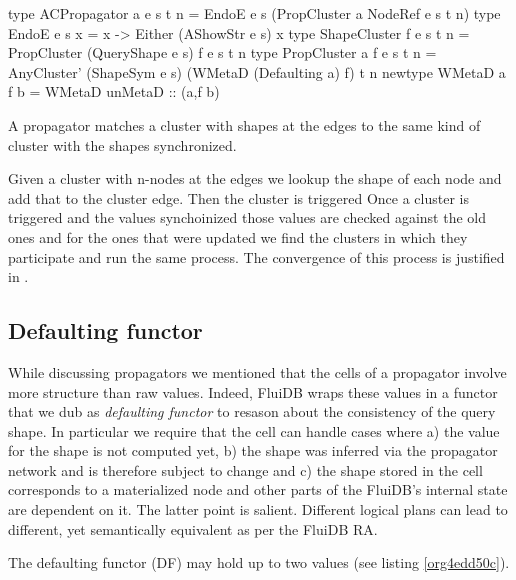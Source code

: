 \begin{listing}[p]
  \begin{haskell}
    type ACPropagator a e s t n =
      EndoE e s (PropCluster a NodeRef e s t n)
    type EndoE e s x = x -> Either (AShowStr e s) x
    type ShapeCluster f e s t n = PropCluster (QueryShape e s) f e s t n
    type PropCluster a f e s t n =
      AnyCluster' (ShapeSym e s) (WMetaD (Defaulting a) f) t n
    newtype WMetaD a f b = WMetaD { unMetaD :: (a,f b)}
      \end{haskell}
  \caption{\label{org945807f}A propagator matches a cluster with shapes at the edges to the same kind of cluster with the shapes synchronized.}
\end{listing}

Given a cluster with n-nodes at the edges we lookup the shape of each
node and add that to the cluster edge. Then the cluster is triggered
Once a cluster is triggered and the values synchoinized those values
are checked against the old ones and for the ones that were updated we
find the clusters in which they participate and run the same
process. The convergence of this process is justified in
\cite{kuperLVarsLatticebasedData2013}.


\subsection{Defaulting functor}
\label{sec:org1d77ea1}
While discussing propagators we mentioned that the cells of a
propagator involve more structure than raw values. Indeed, FluiDB
wraps these values in a functor that we dub as \emph{defaulting functor} to
resason about the consistency of the query shape. In particular we
require that the cell can handle cases where a) the value for the
shape is not computed yet, b) the shape was inferred via the
propagator network and is therefore subject to change and c) the shape
stored in the cell corresponds to a materialized node and other parts
of the FluiDB's internal state are dependent on it. The latter point
is salient. Different logical plans can lead to different, yet
semantically equivalent as per the FluiDB RA.

The defaulting functor (DF) may hold up to two values (see listing
\ref{org4edd50c}).

